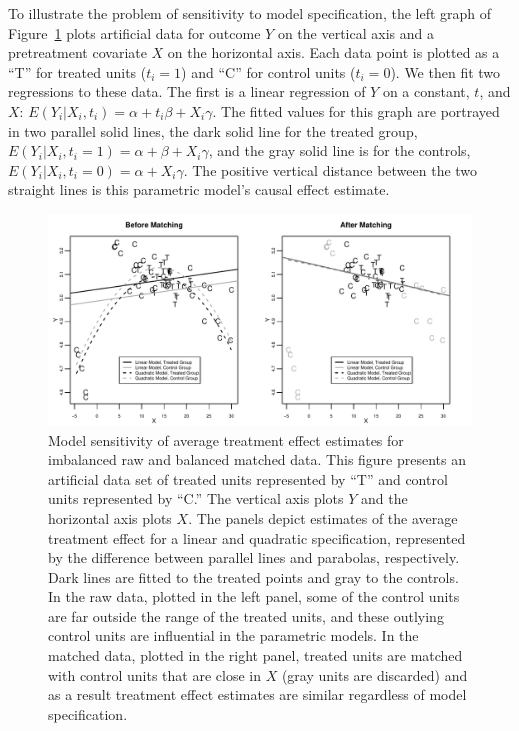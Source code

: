 \documentclass[11pt,titlepage]{article}
\begin{document}
To illustrate the problem of sensitivity to model specification, the
left graph of Figure~\ref{fg:extrap} plots artificial data for outcome
$Y$ on the vertical axis and a pretreatment covariate $X$ on the
horizontal axis.  Each data point is plotted as a ``T'' for treated
units ($t_i=1$) and ``C'' for control units ($t_i=0$).  We then fit
two regressions to these data.  The first is a linear regression of
$Y$ on a constant, $t$, and $X$: $E(Y_i|X_i,t_i)=\alpha + t_i\beta +
X_i\gamma$.  The fitted values for this graph are portrayed in two
parallel solid lines, the dark solid line for the treated group,
$E(Y_i|X_i,t_i=1)=\alpha+\beta+X_i\gamma$, and the gray solid line is
for the controls, $E(Y_i|X_i,t_i=0)=\alpha+X_i\gamma$. The 
positive vertical distance between the two straight lines is this
parametric model's causal effect estimate.
\begin{figure}[t] 
 \begin{center}
   \includegraphics[width=6in]{figs/olspanel-thick.pdf}
  \end{center}
  \vspace{-0.275in}
  \caption{Model sensitivity of average treatment effect estimates for
    imbalanced raw and balanced matched data.  This figure presents an
    artificial data set of treated units represented by ``T'' and
    control units represented by ``C.'' The vertical axis plots $Y$
    and the horizontal axis plots $X$.  The panels depict estimates of
    the average treatment effect for a linear and quadratic
    specification, represented by the difference between parallel
    lines and parabolas, respectively.  Dark lines are fitted to the
    treated points and gray to the controls.  In the raw data, plotted
    in the left panel, some of the control units are far outside the range
    of the treated units, and these outlying control units are influential in the parametric models.
    In the matched data, plotted in the right panel,
    treated units are matched with control units that are close in $X$
    (gray units are discarded) and as a result treatment effect
    estimates are similar regardless of model specification.}
  \label{fg:extrap}
\end{figure}
\end{document}
